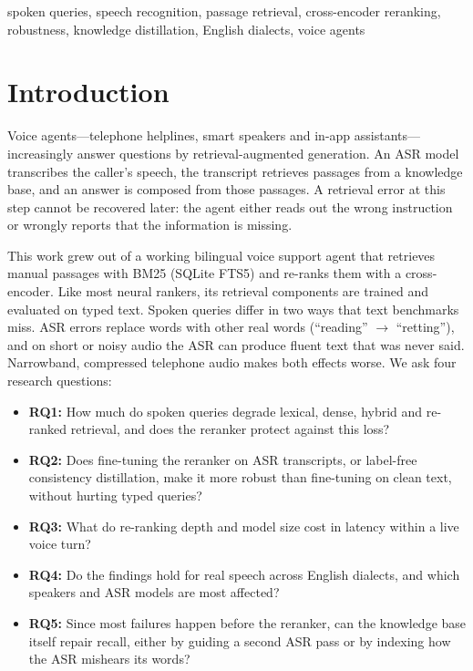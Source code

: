 \documentclass[conference]{IEEEtran}
\newcommand{\ra}{$\rightarrow$}
\begin{document}
\begin{IEEEkeywords}
spoken queries, speech recognition, passage retrieval, cross-encoder reranking, robustness, knowledge distillation, English dialects, voice agents
\end{IEEEkeywords}

\section{Introduction}
Voice agents---telephone helplines, smart speakers and in-app assistants---increasingly answer questions by retrieval-augmented generation. An ASR model transcribes the caller's speech, the transcript retrieves passages from a knowledge base, and an answer is composed from those passages. A retrieval error at this step cannot be recovered later: the agent either reads out the wrong instruction or wrongly reports that the information is missing.

This work grew out of a working bilingual voice support agent that retrieves manual passages with BM25 (SQLite FTS5) and re-ranks them with a cross-encoder. Like most neural rankers, its retrieval components are trained and evaluated on typed text. Spoken queries differ in two ways that text benchmarks miss. ASR errors replace words with other real words (``reading'' \ra{} ``retting''), and on short or noisy audio the ASR can produce fluent text that was never said. Narrowband, compressed telephone audio makes both effects worse. We ask four research questions:
\begin{itemize}
\item \textbf{RQ1:} How much do spoken queries degrade lexical, dense, hybrid and re-ranked retrieval, and does the reranker protect against this loss?
\item \textbf{RQ2:} Does fine-tuning the reranker on ASR transcripts, or label-free consistency distillation, make it more robust than fine-tuning on clean text, without hurting typed queries?
\item \textbf{RQ3:} What do re-ranking depth and model size cost in latency within a live voice turn?
\item \textbf{RQ4:} Do the findings hold for real speech across English dialects, and which speakers and ASR models are most affected?
\item \textbf{RQ5:} Since most failures happen before the reranker, can the knowledge base itself repair recall, either by guiding a second ASR pass or by indexing how the ASR mishears its words?
\end{itemize}
\end{document}
